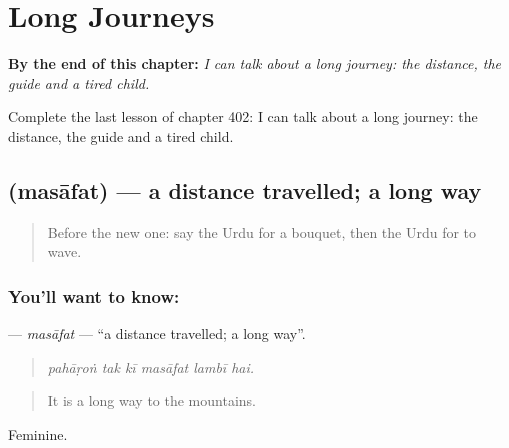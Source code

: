 
\chapter{Long Journeys}
\label{ch:ur-long-journeys}

\begin{chapteropening}
\textbf{By the end of this chapter:} \emph{I can talk about a long journey: the distance, the guide and a tired child.}

Complete the last lesson of chapter 402: I can talk about a long journey: the distance, the guide and a tired child.
\end{chapteropening}

\section[\texorpdfstring{\ur{مسافت} (masāfat)}{مسافت (masāfat)}]{ (masāfat) — a distance travelled; a long way}

\label{lesson:UR-C402-masafat}



\begin{quote}
Before the new one: say the Urdu for a bouquet, then the Urdu for to wave.
\end{quote}

\subsection*{You'll want to know: }
\textbf{} — \emph{masāfat} — \textquotedblleft{}a distance travelled; a long way\textquotedblright{}.

\begin{quote}
     
\end{quote}

\begin{quote}
\emph{pahāṛoṅ tak kī masāfat lambī hai.}
\end{quote}

\begin{quote}
It is a long way to the mountains.
\end{quote}

Feminine.

